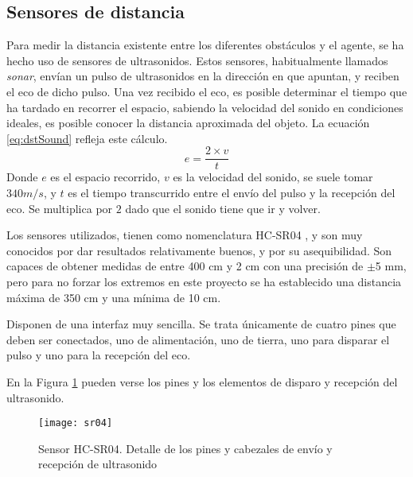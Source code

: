 \subsection{Sensores de distancia}
\label{subsec:hcsr04}
Para medir la distancia existente entre los diferentes obstáculos y el agente, se ha hecho uso de sensores de ultrasonidos. Estos sensores, habitualmente llamados \emph{sonar}, envían un pulso de ultrasonidos en la dirección en que apuntan, y reciben el eco de dicho pulso. Una vez recibido el eco, es posible determinar el tiempo que ha tardado en recorrer el espacio, sabiendo la velocidad del sonido en condiciones ideales, es posible conocer la distancia aproximada del objeto. 
La ecuación \ref{eq:dstSound} refleja este cálculo.
\begin{equation}
\label{eq:dstSound}
e = \frac{2 \times v}{t}
\end{equation}
Donde $e$ es el espacio recorrido, $v$ es la velocidad del sonido, se suele tomar $340m/s$, y $t$ es el tiempo transcurrido entre el envío del pulso y la recepción del eco. Se multiplica por $2$ dado que el sonido tiene que ir y volver.

Los sensores utilizados, tienen como nomenclatura HC-SR04 \citep{wiki:sparkHCsr04}, y son muy conocidos por dar resultados relativamente buenos, y por su asequibilidad. 
Son capaces de obtener medidas de entre 400 cm y 2 cm con una precisión de $\pm$5 mm, pero para no forzar los extremos en este proyecto se ha establecido una distancia máxima de 350 cm y una mínima de 10 cm. 

Disponen de una interfaz muy sencilla. Se trata únicamente de cuatro pines que deben ser conectados, uno de alimentación, uno de tierra, uno para disparar el pulso y uno para la recepción del eco. 

En la Figura \ref{fig:sr04} pueden verse los pines y los elementos de disparo y recepción del ultrasonido. 

\begin{figure}
	\centering
	\texttt{[image: sr04]}
	\caption[Sensor HC-SR04]{Sensor HC-SR04. Detalle de los pines y cabezales de envío y recepción de ultrasonido}\label{fig:sr04}
\end{figure}

